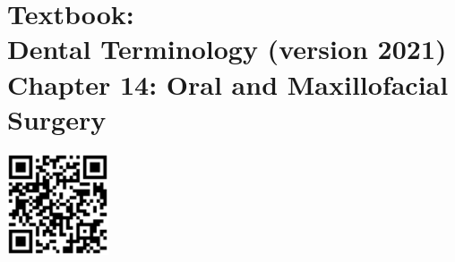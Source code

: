 \documentclass[
paper=landscape,
paper=160mm:90mm, %
fontsize=11pt, %
pagesize, %
parskip=half-, %
]{scrartcl} %
\theoremstyle{mythmstyle} %
\begin{document}





\clearpage





\section*{Textbook: \\
Dental Terminology (version 2021)\\
Chapter 14: Oral and Maxillofacial Surgery}
\thispagestyle{headings} %
%
%


\includegraphics[width=3cm]{qrcode_15880804_DentalTerminologyAmazon.png}
\end{document}
